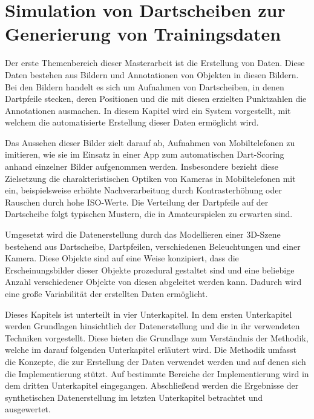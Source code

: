 
\chapter{Simulation von Dartscheiben zur Generierung von Trainingsdaten}
\label{cha:daten}

Der erste Themenbereich dieser Masterarbeit ist die Erstellung von Daten. Diese Daten bestehen aus Bildern und Annotationen von Objekten in diesen Bildern. Bei den Bildern handelt es sich um Aufnahmen von Dartscheiben, in denen Dartpfeile stecken, deren Positionen und die mit diesen erzielten Punktzahlen die Annotationen ausmachen. In diesem Kapitel wird ein System vorgestellt, mit welchem die automatisierte Erstellung dieser Daten ermöglicht wird.

Das Aussehen dieser Bilder zielt darauf ab, Aufnahmen von Mobiltelefonen zu imitieren, wie sie im Einsatz in einer App zum automatischen Dart-Scoring anhand einzelner Bilder aufgenommen werden. Insbesondere bezieht diese Zielsetzung die charakteristischen Optiken von Kameras in Mobiltelefonen mit ein, beispielsweise erhöhte Nachverarbeitung durch Kontrasterhöhung oder Rauschen durch hohe ISO-Werte. Die Verteilung der Dartpfeile auf der Dartscheibe folgt typischen Mustern, die in Amateurspielen zu erwarten sind.

Umgesetzt wird die Datenerstellung durch das Modellieren einer 3D-Szene bestehend aus Dartscheibe, Dartpfeilen, verschiedenen Beleuchtungen und einer Kamera. Diese Objekte sind auf eine Weise konzipiert, dass die Erscheinungsbilder dieser Objekte prozedural gestaltet sind und eine beliebige Anzahl verschiedener Objekte von diesen abgeleitet werden kann. Dadurch wird eine große Variabilität der erstellten Daten ermöglicht.

Dieses Kapitels ist unterteilt in vier Unterkapitel. In dem ersten Unterkapitel werden Grundlagen hinsichtlich der Datenerstellung und die in ihr verwendeten Techniken vorgestellt. Diese bieten die Grundlage zum Verständnis der Methodik, welche im darauf folgenden Unterkapitel erläutert wird. Die Methodik umfasst die Konzepte, die zur Erstellung der Daten verwendet werden und auf denen sich die Implementierung stützt. Auf bestimmte Bereiche der Implementierung wird in dem dritten Unterkapitel eingegangen. Abschließend werden die Ergebnisse der synthetischen Datenerstellung im letzten Unterkapitel betrachtet und ausgewertet.





